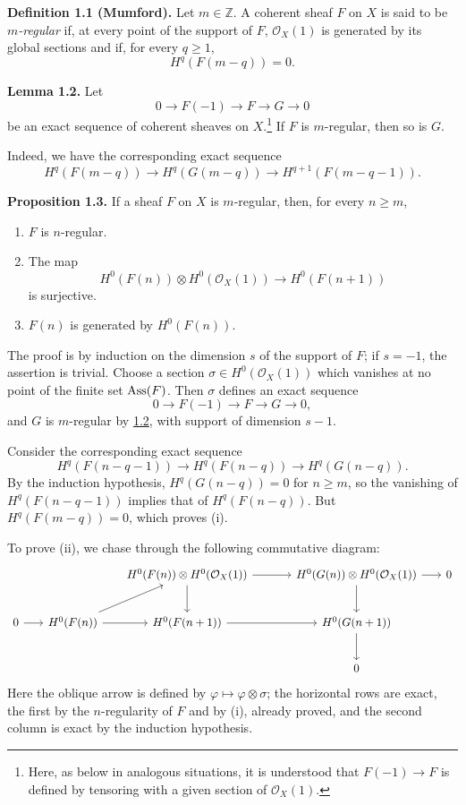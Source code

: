 \textbf{Definition 1.1 (Mumford).} Let \(m\in\mathbb Z\). A coherent sheaf
\(F\) on \(X\) is said to be \emph{\(m\)-regular} if, at every point of the
support of \(F\), \(\mathcal O_X(1)\) is generated by its global sections
and if, for every \(q\geq1\),
\[
  H^q(F(m-q))=0.
\]

\textbf{Lemma 1.2.} Let
\[
  0\longrightarrow F(-1)\longrightarrow F\longrightarrow G\longrightarrow0
\]
be an exact sequence of coherent sheaves on \(X\).\footnote{Here, as below
in analogous situations, it is understood that \(F(-1)\to F\) is defined
by tensoring with a given section of \(\mathcal O_X(1)\).} If \(F\) is
\(m\)-regular, then so is \(G\).

Indeed, we have the corresponding exact sequence
\[
  H^q(F(m-q))\longrightarrow H^q(G(m-q))
  \longrightarrow H^{q+1}(F(m-q-1)).
\]

\textbf{Proposition 1.3.} If a sheaf \(F\) on \(X\) is \(m\)-regular,
then, for every \(n\geq m\),
\begin{enumerate}[label=(\roman*)]
\item \(F\) is \(n\)-regular.
\item The map
\[
  H^0(F(n))\otimes H^0(\mathcal O_X(1))
  \longrightarrow H^0(F(n+1))
\]
is surjective.
\item \(F(n)\) is generated by \(H^0(F(n))\).
\end{enumerate}

\newpage
The proof is by induction on the dimension \(s\) of the support of \(F\); if
\(s=-1\), the assertion is trivial. Choose a section
\(\sigma\in H^0(\mathcal O_X(1))\) which vanishes at no point of the finite
set \(\operatorname{Ass}(F)\). Then \(\sigma\) defines an exact sequence
\[
  0\longrightarrow F(-1)\longrightarrow F\longrightarrow G\longrightarrow0,
\]
and \(G\) is \(m\)-regular by \hyperlink{sga6.e13.lem.1-2}{1.2}, with support of dimension \(s-1\).

Consider the corresponding exact sequence
\[
  H^q(F(n-q-1))\longrightarrow H^q(F(n-q))
  \longrightarrow H^q(G(n-q)).
\]
By the induction hypothesis, \(H^q(G(n-q))=0\) for \(n\geq m\), so the
vanishing of \(H^q(F(n-q-1))\) implies that of \(H^q(F(n-q))\). But
\(H^q(F(m-q))=0\), which proves (i).

To prove (ii), we chase through the following commutative diagram:
\[
\begin{tikzcd}[column sep=1.7em,row sep=2.4em]
  & & H^0(F(n))\otimes H^0(\mathcal O_X(1))
      \arrow[rr] \arrow[d]
  & & H^0(G(n))\otimes H^0(\mathcal O_X(1))
      \arrow[r] \arrow[d]
  & 0 \\
  0 \arrow[r]
  & H^0(F(n)) \arrow[ur] \arrow[r]
  & H^0(F(n+1)) \arrow[rr]
  & & H^0(G(n+1)) \arrow[d] \\
  & & & & 0
\end{tikzcd}
\]
Here the oblique arrow is defined by
\(\varphi\mapsto\varphi\otimes\sigma\); the horizontal rows are exact, the
first by the \(n\)-regularity of \(F\) and by (i), already proved, and the
second column is exact by the induction hypothesis.

